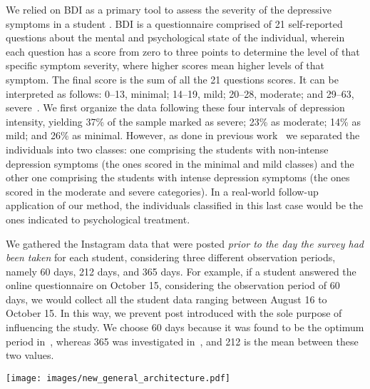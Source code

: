 \documentclass[letterpaper]{article} \usepackage{aaai20}  \usepackage{times}  \usepackage{helvet} \usepackage{courier}  \usepackage[hyphens]{url}  \usepackage{graphicx} \urlstyle{rm} \def\UrlFont{\rm}  \usepackage{graphicx}  \frenchspacing  \setlength{\pdfpagewidth}{8.5in}  \setlength{\pdfpageheight}{11in}  \usepackage[final]{changes}
\begin{document}
We relied on BDI as a primary tool to assess the severity of the depressive symptoms in a student . BDI is a questionnaire comprised of 21 self-reported questions about the mental and psychological state of the individual, wherein each question has a score from zero to three points to determine the level of that specific symptom severity, where higher scores mean higher levels of that symptom. The final score is the sum of all the 21 questions scores. It can be interpreted as follows: 0--13, minimal; 14--19, mild; 20--28, moderate; and 29--63, severe~\cite{inventarioBeckII}. We first organize the data following these four intervals of depression intensity, yielding 37\% of the sample marked as severe; 23\% as moderate; 14\% as mild; and 26\% as minimal. However, as done in previous work~\cite{de2013predicting,shen2017depression} we separated the individuals into two classes: one comprising the students with non-intense depression symptoms (the ones scored in the minimal and mild classes) and the other one comprising the students with intense depression symptoms (the ones scored in the moderate and severe categories). In a real-world follow-up application of our method, the individuals classified in this last case would be the ones indicated to psychological treatment.  


We gathered the Instagram data that were posted \emph{prior to the day the survey had been taken} for each student, considering three different observation periods, namely 60 days, 212 days, and 365 days. For example, if a student answered the online questionnaire on October 15, considering the observation period of 60 days, we would collect all the student data ranging between August 16 to October 15. In this way, we prevent post introduced with the sole purpose of influencing the study. We choose 60 days because it was found to be the optimum period in~\cite{tsugawa2015recognizing}, whereas 365 was investigated in~\cite{de2013predicting}, and 212 is the mean between these two values.

\begin{figure*}[h]
\centering
\texttt{[image: images/new\_general\_architecture.pdf]}
\caption{}
\label{fig:models}
\end{figure*}
\end{document}
